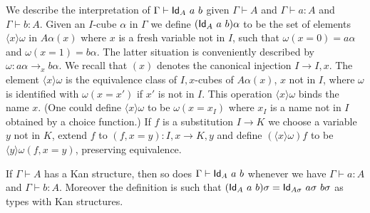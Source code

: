 \documentclass[10pt,a4paper]{article}
\makeatletter
\newcommand{\Id}{{\sf Id}}
\newcommand{\bind}[2]{{\langle}#1{\rangle}#2}
\newcommand{\napp}{\mathop{\boldsymbol{@}}}
\makeatother
\begin{document}
We describe the interpretation of $\Gamma\vdash\Id_A~a~b$ given
$\Gamma\vdash A$ and $\Gamma\vdash a:A$ and $\Gamma\vdash b:A$. Given
an $I$-cube $\alpha$ in $\Gamma$ we define $(\Id_A~a~b)\alpha$ to be
the set of elements $\bind{x}{\omega}$ in $A\alpha(x)$ where $x$ is a
fresh variable not in $I$, such that $\omega(x=0) = a\alpha$ and
$\omega(x=1) = b\alpha$. The latter situation is conveniently
described by $\omega: a\alpha\to_x b\alpha$.  We recall that $(x)$
denotes the canonical injection $I \to I,x$. The element
$\bind{x}{\omega}$ is the equivalence class of $I,x$-cubes of
$A\alpha(x)$, $x$ not in $I$, where $\omega$ is identified with
$\omega(x=x')$ if $x'$ is not in $I$. This operation
$\bind{x}{\omega}$ binds the name $x$.  (One could define
$\bind{x}{\omega}$ to be $\omega(x = x_I)$ where $x_I$ is a name not
in $I$ obtained by a choice function.) If $f$ is a substitution $I \to
K$ we choose a variable $y$ not in $K$, extend $f$ to $(f,x=y): I,x
\to K,y$ and define $(\bind{x}{\omega}) f$ to be $\bind{y}{\omega
  (f,x=y)}$, preserving equivalence.

\begin{theorem}
  If $\Gamma\vdash A$ has a Kan structure, then so does
  $\Gamma\vdash\Id_A~a~b$ whenever we have $\Gamma\vdash a:A$ and
  $\Gamma\vdash b:A$.  Moreover the definition is such that
  $(\Id_A~a~b) \sigma = \Id_{A \sigma}~a \sigma~b \sigma$ as types
  with Kan structures.
\end{theorem}
\end{document}
